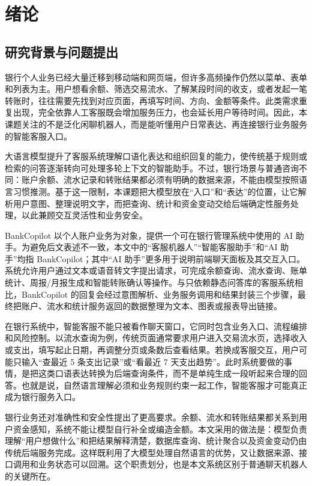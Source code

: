 \documentclass[bachelor, print]{xduthesis}
\begin{document}
\makecover

\tableofcontents

\mainmatter

\chapter{绪论}

\section{研究背景与问题提出}

银行个人业务已经大量迁移到移动端和网页端，但许多高频操作仍然以菜单、表单和列表为主。用户想看余额、筛选交易流水、了解某段时间的收支，或者发起一笔转账时，往往需要先找到对应页面，再填写时间、方向、金额等条件。此类需求重复出现，完全依靠人工客服既会增加服务压力，也会延长用户等待时间。因此，本课题关注的不是泛化闲聊机器人，而是能听懂用户日常表达、再连接银行业务服务的智能客服入口。

大语言模型提升了客服系统理解口语化表达和组织回复的能力，使传统基于规则或检索的问答逐渐转向可处理多轮上下文的智能助手\cite{zhao2023survey}。不过，银行场景与普通咨询不同：账户余额、流水记录和转账结果都必须有明确的数据来源，不能由模型按照语言习惯推测。基于这一限制，本课题把大模型放在“入口”和“表达”的位置，让它解析用户意图、整理说明文字，而把查询、统计和资金变动交给后端确定性服务处理，以此兼顾交互灵活性和业务安全。

BankCopilot 以个人账户业务为对象，提供一个可在银行管理系统中使用的 AI 助手。为避免后文表述不一致，本文中的“客服机器人”“智能客服助手”和“AI 助手”均指 BankCopilot；其中“AI 助手”更多用于说明前端聊天面板及其交互入口。系统允许用户通过文本或语音转文字提出请求，可完成余额查询、流水查询、账单统计、周报/月报生成和智能转账确认等操作。与只依赖静态问答库的客服系统相比，BankCopilot 的回复会经过意图解析、业务服务调用和结果封装三个步骤，最终把账户、流水和统计服务返回的数据整理为文本、图表或报表导出链接。

在银行系统中，智能客服不能只被看作聊天窗口，它同时包含业务入口、流程编排和风险控制。以流水查询为例，传统页面通常要求用户进入交易流水页，选择收入或支出，填写起止日期，再调整分页或条数后查看结果。若换成客服交互，用户可能只输入“查最近 5 条支出记录”或“看最近 7 天支出趋势”。此时系统要做的事情，是把这类口语表达转换为后端查询条件，而不是单纯生成一段听起来合理的回答。也就是说，自然语言理解必须和业务规则约束一起工作，智能客服才可能真正成为银行服务入口。

银行业务还对准确性和安全性提出了更高要求。余额、流水和转账结果都关系到用户资金感知，系统不能让模型自行补全或编造金额。本文采用的做法是：模型负责理解“用户想做什么”和把结果解释清楚，数据库查询、统计聚合以及资金变动仍由传统后端服务完成。这样既利用了大模型处理自然语言的优势，又让数据来源、接口调用和业务状态可以回溯。这个职责划分，也是本文系统区别于普通聊天机器人的关键所在。
\end{document}
